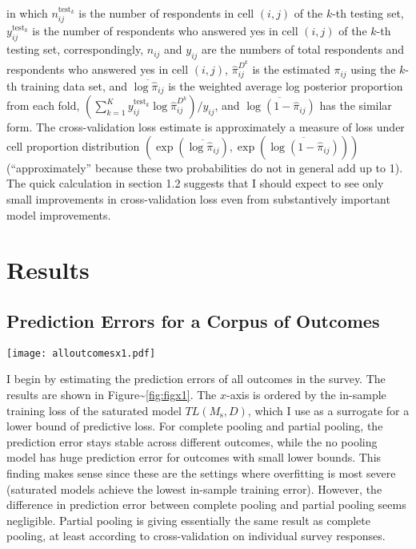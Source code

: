 \noindent in which \(n_{ij}^{\text{test}_k}\) is the number of
respondents in cell \((i,j)\) of the \(k\)-th testing set,
\(y_{ij}^{\text{test}_k}\) is the number of respondents who answered yes
in cell \((i,j)\) of the \(k\)-th testing set, correspondingly,
\(n_{ij}\) and \(y_{ij}\) are the numbers of total respondents and
respondents who answered yes in cell \((i,j)\), \(\hat\pi_{ij}^{D^k}\)
is the estimated \(\pi_{ij}\) using the \(k\)-th training data set, and
\(\overline{\log\hat\pi_{ij}}\) is the weighted average log posterior
proportion from each fold,
\(\left(\sum_{k=1}^Ky^{\text{test}_k}_{ij}\log\hat\pi_{ij}^{D^k} \right)\big/y_{ij}\),
and \(\overline{\log(1-\hat\pi_{ij})}\) has the similar form. The
cross-validation loss estimate is approximately a measure of loss under
cell proportion distribution
\((\exp(\overline{\log\hat\pi_{ij}}), \exp(\overline{\log(1-\hat\pi_{ij})}))\)
(``approximately'' because these two probabilities do not in general add
up to 1). The quick calculation in section 1.2 suggests that I should
expect to see only small improvements in cross-validation loss even from
substantively important model improvements.

\section{Results}\label{results}

\subsection{Prediction Errors for a Corpus of
Outcomes}\label{prediction-errors-for-a-corpus-of-outcomes}

\begin{figure*}[p!]
  \centering
  \texttt{[image: alloutcomesx1.pdf]}
  \caption{\em Measure of fit (estimated prediction error) for all response outcomes
    in the 2006 Cooperative Congressional Election Survey. Outcomes are ordered by the lower bound
    (in-sample loss of the saturated model). The no pooling model
    gives a bad fit.  Partial pooling does best but in most cases is almost indistinguishable from complete pooling under the cross-validation criterion.}
  \label{fig:figx1}
\end{figure*}

I begin by estimating the prediction errors of all outcomes in the
survey. The results are shown in Figure\textasciitilde{}\ref{fig:figx1}.
The \(x\)-axis is ordered by the in-sample training loss of the
saturated model \(TL(M_{\text{s}},D)\), which I use as a surrogate for a
lower bound of predictive loss. For complete pooling and partial
pooling, the prediction error stays stable across different outcomes,
while the no pooling model has huge prediction error for outcomes with
small lower bounds. This finding makes sense since these are the
settings where overfitting is most severe (saturated models achieve the
lowest in-sample training error). However, the difference in prediction
error between complete pooling and partial pooling seems negligible.
Partial pooling is giving essentially the same result as complete
pooling, at least according to cross-validation on individual survey
responses.

